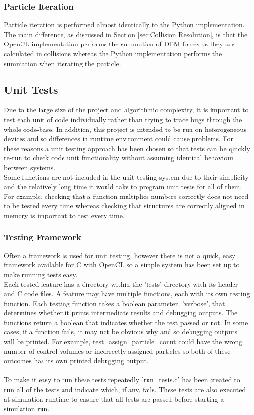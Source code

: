 \documentclass[a4paper,11pt,titlepage]{report}
\begin{document}
\subsubsection{Particle Iteration}
Particle iteration is performed almost identically to the Python implementation. The main difference, as discussed in Section \ref{sec:Collision Resolution}, is that the OpenCL implementation performs the summation of DEM forces as they are calculated in collisions whereas the Python implementation performs the summation when iterating the particle.
\subsection{Unit Tests}
Due to the large size of the project and algorithmic complexity, it is important to test each unit of code individually rather than trying to trace bugs through the whole code-base. In addition, this project is intended to be run on heterogeneous devices and so differences in runtime environment could cause problems. For these reasons a unit testing approach has been chosen so that tests can be quickly re-run to check code unit functionality without assuming identical behaviour between systems.
\\Some functions are not included in the unit testing system due to their simplicity and the relatively long time it would take to program unit tests for all of them. For example, checking that a function multiplies numbers correctly does not need to be tested every time whereas checking that structures are correctly aligned in memory is important to test every time.
\subsubsection{Testing Framework}
Often a framework is used for unit testing, however there is not a quick, easy framework available for C with OpenCL so a simple system has been set up to make running tests easy.
\\Each tested feature has a directory within the 'tests' directory with its header and C code files. A feature may have multiple functions, each with its own testing function. Each testing function takes a boolean parameter, 'verbose', that determines whether it prints intermediate results and debugging outputs. The functions return a boolean that indicates whether the test passed or not. In some cases, if a function fails, it may not be obvious why and so debugging outputs will be printed. For example, test\_assign\_particle\_count could have the wrong number of control volumes or incorrectly assigned particles so both of these outcomes has its own printed debugging output.
\\\\To make it easy to run these tests repeatedly 'run\_tests.c' has been created to run all of the tests and indicate which, if any, fails. These tests are also executed at simulation runtime to ensure that all tests are passed before starting a simulation run.
\end{document}

